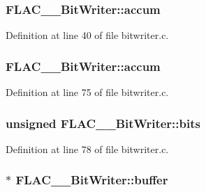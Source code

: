 \subsubsection[{\texorpdfstring{accum}{accum}}]{ F\+L\+A\+C\+\_\+\+\_\+\+Bit\+Writer\+::accum}\hypertarget{struct_f_l_a_c_____bit_writer_aa9fe71d7ae8e9702242bc4c4660aa649}{}\label{struct_f_l_a_c_____bit_writer_aa9fe71d7ae8e9702242bc4c4660aa649}


Definition at line 40 of file bitwriter.\+c.

\subsubsection[{\texorpdfstring{accum}{accum}}]{ F\+L\+A\+C\+\_\+\+\_\+\+Bit\+Writer\+::accum}\hypertarget{struct_f_l_a_c_____bit_writer_abbfbd68ac3abfc1351a75c0af1b20feb}{}\label{struct_f_l_a_c_____bit_writer_abbfbd68ac3abfc1351a75c0af1b20feb}


Definition at line 75 of file bitwriter.\+c.

\subsubsection[{\texorpdfstring{bits}{bits}}]{\setlength{\rightskip}{0pt plus 5cm}unsigned F\+L\+A\+C\+\_\+\+\_\+\+Bit\+Writer\+::bits}\hypertarget{struct_f_l_a_c_____bit_writer_ae397bee0458fc8bdd02ba5ecefddfbb8}{}\label{struct_f_l_a_c_____bit_writer_ae397bee0458fc8bdd02ba5ecefddfbb8}


Definition at line 78 of file bitwriter.\+c.

\subsubsection[{\texorpdfstring{buffer}{buffer}}]{$\ast$ F\+L\+A\+C\+\_\+\+\_\+\+Bit\+Writer\+::buffer}\hypertarget{struct_f_l_a_c_____bit_writer_acb67e48bb8ba97835d71ed972c287a96}{}\label{struct_f_l_a_c_____bit_writer_acb67e48bb8ba97835d71ed972c287a96}



